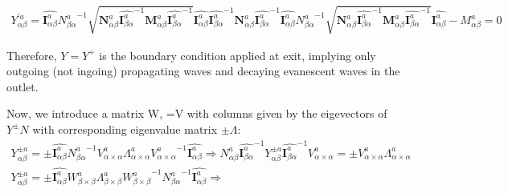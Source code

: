 \documentclass{Note}
\begin{document}
\begin{equation}
\begin{aligned}
{Y}_{\alpha\beta}^{'a} = {\widehat{\textbf{I}_{ \alpha \beta}^a}} {N_{\beta \alpha}^a}^{-1} \sqrt{ \textbf{N}_{\alpha\beta}^a  {\widehat{\textbf{I}_{\beta \alpha}^a}}^{-1} \textbf{M}_{\alpha\beta}^a{\widehat{\textbf{I}_{\beta \alpha}^a}}^{-1}}  {\widehat{\textbf{I}_{ \alpha \beta}^a}} {\widehat{\textbf{I}_{\beta \alpha}^a}}^{-1}   \textbf{N}_{\alpha\beta}^a {\widehat{\textbf{I}_{\beta \alpha}^a}}^{-1}  {\widehat{\textbf{I}_{ \alpha \beta}^a}} {N_{\beta \alpha}^a}^{-1} \sqrt{ \textbf{N}_{\alpha\beta}^a  {\widehat{\textbf{I}_{\beta \alpha}^a}}^{-1} \textbf{M}_{\alpha\beta}^a{\widehat{\textbf{I}_{\beta \alpha}^a}}^{-1}}{\widehat{\textbf{I}_{ \alpha \beta}^a}}-M_{\alpha\beta}^a=0
\end{aligned}
\end{equation}

Therefore, $Y=Y^+$ is the boundary condition applied at exit, implying only outgoing (not ingoing) propagating waves and decaying evanescent waves in the outlet.


Now, we introduce a matrix W, =V  with columns given by the eigevectors of $Y^{\pm}N$ with corresponding eigenvalue matrix $\pm \Lambda$:
\begin{equation}
\begin{aligned}
  Y_{\alpha\beta}^{\pm a}=\pm   {\widehat{\textbf{I}_{ \alpha \beta}^a}} {N_{\beta \alpha}^a}^{-1} V_{\alpha\times\alpha}^a \Lambda _{\alpha\times\alpha}^a {V_{\alpha\times\alpha}^a}^{-1}{\widehat{\textbf{I}_{\alpha\beta }^a}}
 \Rightarrow 
  {N_{\alpha\beta }^a} {\widehat{\textbf{I}_{  \beta\alpha}^a}} ^{-1} Y_{\alpha\beta}^{\pm a}{\widehat{\textbf{I}_{  \beta\alpha}^a}} ^{-1} V_{\alpha\times\alpha}^a =\pm  V_{\alpha\times\alpha}^a\Lambda _{\alpha\times\alpha}^a
\\
  Y_{\alpha\beta}^{\pm a}=\pm {\widehat{\textbf{I}_{ \alpha \beta}^a}}  W_{\beta\times\beta}^a\Lambda_{\beta\times\beta}^a {W_{\beta\times\beta}^a}^{-1} {N_{\beta \alpha}^a}^{-1}  {\widehat{\textbf{I}_{ \alpha \beta}^a}} 
   \Rightarrow
\end{aligned}
\end{equation}
\end{document}
